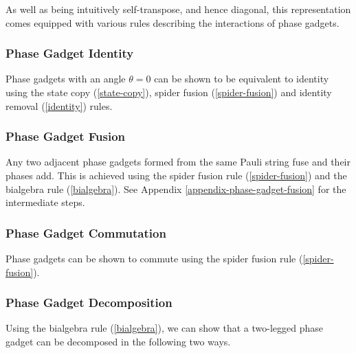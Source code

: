 %
\label{phase-gadget-proof}

As well as being intuitively self-transpose, and hence diagonal, this representation comes equipped with various rules describing the interactions of phase gadgets. 


\subsubsection{Phase Gadget Identity}%
\label{phase-gadget-identity}

Phase gadgets with an angle $\theta = 0$ can be shown to be equivalent to identity using the state copy (\ref{state-copy}), spider fusion (\ref{spider-fusion}) and identity removal (\ref{identity}) rules.



\subsubsection{Phase Gadget Fusion}%
\label{phase-gadget-fusion}

Any two adjacent phase gadgets formed from the same Pauli string fuse and their phases add. This is achieved using the spider fusion rule (\ref{spider-fusion}) and the bialgebra rule (\ref{bialgebra}). See Appendix  \ref{appendix-phase-gadget-fusion} for the intermediate steps.



\subsubsection{Phase Gadget Commutation}%
\label{phase-gadget-commutation}

Phase gadgets can be shown to commute using the spider fusion rule (\ref{spider-fusion}).



\subsubsection{Phase Gadget Decomposition}%

Using the bialgebra rule (\ref{bialgebra}), we can show that a two-legged phase gadget can be decomposed in the following two ways.

